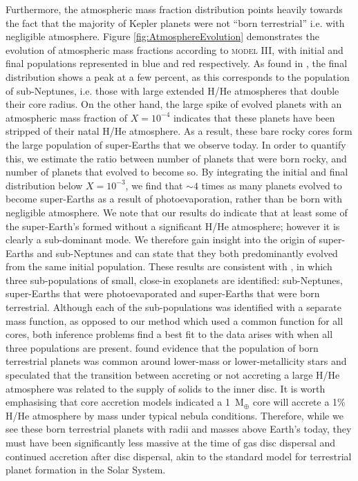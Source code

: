 \documentclass[fleqn,usenatbib]{mnras}
\begin{document}
Furthermore, the atmospheric mass fraction distribution points heavily towards the fact that the majority of Kepler planets were not ``born terrestrial'' i.e. with negligible atmosphere. Figure \ref{fig:AtmosphereEvolution} demonstrates the evolution of atmospheric mass fractions according to \textsc{model III}, with initial and final populations represented in blue and red respectively. As found in \cite{WolfgangLopez2015}, the final distribution shows a peak at a few percent, as this corresponds to the population of sub-Neptunes, i.e. those with large extended H/He atmospheres that double their core radius. On the other hand, the large spike of evolved planets with an atmospheric mass fraction of $X=10^{-4}$ indicates that these planets have been stripped of their natal H/He atmosphere. As a result, these bare rocky cores form the large population of super-Earths that we observe today. In order to quantify this, we estimate the ratio between number of planets that were born rocky, and number of planets that evolved to become so. By integrating the initial and final distribution below $X=10^{-3}$, we find that $\sim 4$ times as many planets evolved to become super-Earths as a result of photoevaporation, rather than be born with negligible atmosphere. We note that our results do indicate that at least some of the super-Earth's formed without a significant H/He atmosphere; however it is clearly a sub-dominant mode. We therefore gain insight into the origin of super-Earths and sub-Neptunes and can state that they both predominantly evolved from the same initial population. These results are consistent with \cite{NeilRogers2020}, in which three sub-populations of small, close-in exoplanets are identified: sub-Neptunes, super-Earths that were photoevaporated and super-Earths that were born terrestrial. Although each of the sub-populations was identified with a separate mass function, as opposed to our method which used a common function for all cores, both inference problems find a best fit to the data arises with when all three populations are present. \citet{OMC19} found evidence that the population of born terrestrial planets was common around lower-mass or lower-metallicity stars and speculated that the transition between accreting or not accreting a large H/He atmosphere was related to the supply of solids to the inner disc. It is worth emphasising that core accretion models \citep[e.g.][]{LeeChiang2015} indicated a 1~M$_\oplus$ core will accrete a 1\% H/He atmosphere by mass under typical nebula conditions. Therefore, while we see these born terrestrial planets with radii and masses above Earth's today, they must have been significantly less massive at the time of gas disc dispersal and continued accretion after disc dispersal, akin to the standard model for terrestrial planet formation in the Solar System. 
\end{document}
